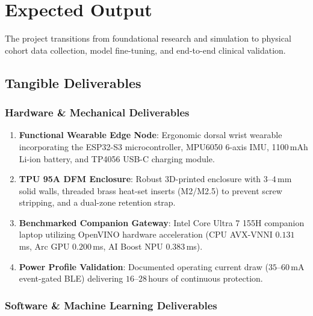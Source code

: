 \chapter{Expected Output}\label{chap:expected_output}

The project transitions from foundational research and simulation to physical cohort data collection, model fine-tuning, and end-to-end clinical validation.

\section{Tangible Deliverables}

\subsection{Hardware \& Mechanical Deliverables}

\begin{enumerate}
    \item \textbf{Functional Wearable Edge Node}: Ergonomic dorsal wrist wearable incorporating the ESP32-S3 microcontroller, MPU6050 6-axis IMU, 1100\,mAh Li-ion battery, and TP4056 USB-C charging module.
    \item \textbf{TPU 95A DFM Enclosure}: Robust 3D-printed enclosure with $3\text{--}4$\,mm solid walls, threaded brass heat-set inserts (M2/M2.5) to prevent screw stripping, and a dual-zone retention strap.
    \item \textbf{Benchmarked Companion Gateway}: Intel Core Ultra 7 155H companion laptop utilizing OpenVINO hardware acceleration (CPU AVX-VNNI $0.131$\,ms, Arc GPU $0.200$\,ms, AI Boost NPU $0.383$\,ms).
    \item \textbf{Power Profile Validation}: Documented operating current draw ($35\text{--}60$\,mA event-gated BLE) delivering $16\text{--}28$\,hours of continuous protection.
\end{enumerate}

\subsection{Software \& Machine Learning Deliverables}

